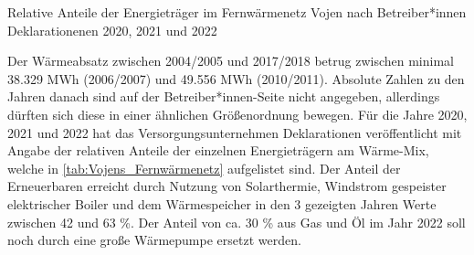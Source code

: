 			\begin{table}[H]
				\centering
				\caption{Relative Anteile der Energieträger im Fernwärmenetz Vojen nach Betreiber*innen Deklarationenen 2020, 2021 und 2022 \cite{web_vojens_deklaration}}
				\label{tab:Vojens_Fernwärmenetz}
			\end{table}
			
			Der Wärmeabsatz zwischen 2004/2005 und 2017/2018 betrug zwischen minimal 38.329 MWh (2006/2007) und 49.556 MWh (2010/2011). Absolute Zahlen zu den Jahren danach sind auf der Betreiber*innen-Seite nicht angegeben, allerdings dürften sich diese in einer ähnlichen Größenordnung bewegen. Für die Jahre 2020, 2021 und 2022 hat das Versorgungsunternehmen Deklarationen veröffentlicht mit Angabe der relativen Anteile der einzelnen Energieträgern am Wärme-Mix, welche in \autoref{tab:Vojens_Fernwärmenetz} aufgelistet sind. Der Anteil der Erneuerbaren erreicht durch Nutzung von Solarthermie, Windstrom gespeister elektrischer Boiler und dem Wärmespeicher in den 3 gezeigten Jahren Werte zwischen 42 und 63 \%. Der Anteil von ca. 30 \% aus Gas und Öl im Jahr 2022 soll noch durch eine große Wärmepumpe ersetzt werden.
			
